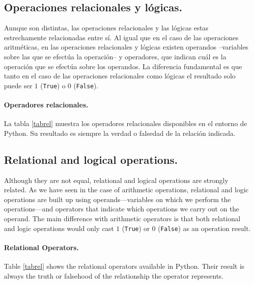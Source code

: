 \begin{paracol}{2}
\subsection{Operaciones relacionales y lógicas.}
Aunque son distintas, las operaciones relacionales y las lógicas estas estrechamente relacionadas entre sí. Al igual que en el caso de las operaciones aritméticas, en las operaciones relacionales y lógicas existen operandos --variables sobre las que se efectúa la operación-- y operadores, que indican cuál es la operación que se efectúa sobre los operandos. La diferencia fundamental es que tanto en el caso de las operaciones relacionales como lógicas el resultado solo puede ser $1$ (\texttt{True}) o $0$ (\texttt{False}). 

\paragraph{Operadores relacionales.}La tabla \ref{tabrel} muestra los operadores relacionales disponibles en el entorno de Python. Su resultado es siempre la verdad o falsedad de la relación indicada. 
\switchcolumn
\subsection{Relational and logical operations.}
Although they are not equal, relational and logical operations are strongly related. As we have seen in the case of arithmetic operations, relational and logic operations are built up using operands—variables on which we perform the operations—and operators that indicate which operations we carry out on the operand.  The main difference with arithmetic operators is that both relational and logic operations would only cast $1$ (\texttt{True}) or $0$ (\texttt{False}) as an operation result.  

\paragraph{Relational Operators.} Table \ref{tabrel} shows the relational operators available in Python. Their result is always the truth or falsehood of the relationship the operator represents.
\end{paracol}


